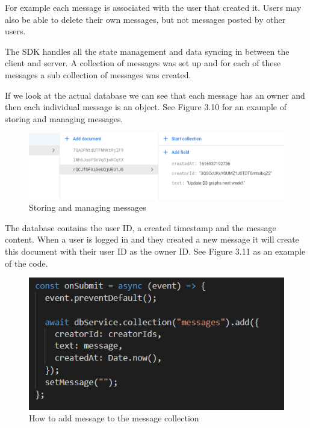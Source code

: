 For example each message is associated with the user that created it. Users may also be able to delete their own messages, but not messages posted by other users.



The SDK handles all the state management and data syncing in between the client and server. A collection of messages was set up and for each of these messages a sub collection of messages was created.

\vspace{5mm}

If we look at the actual database we can see that each message has an owner and then each individual message is an object.
See Figure 3.10 for an example of storing and managing messages.

\begin{figure}[H]
    \centering
    \includegraphics[scale=0.5]{img/FirestoreMessage.PNG}
    \caption{Storing and managing messages}
    \label{fig:my_labe6}
\end{figure}


The database contains the user ID, a created timestamp and the message content.
When a user is logged in and they created a new message it will create this document with their user ID as the owner ID. See Figure 3.11 as an example of the code.

\begin{figure}[H]
    \centering
    \includegraphics[scale=0.95]{img/message.PNG}
    \caption{How to add message to the message collection}
    \label{fig:my_labe5}
\end{figure}

